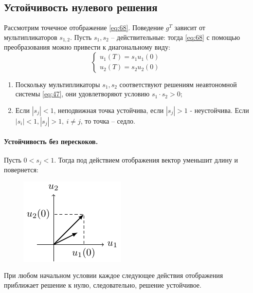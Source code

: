 \subsection{Устойчивость нулевого решения}
Рассмотрим точечное отображение \eqref{eq:68}. Поведение $g^T$ зависит от мультипликаторов $s_{1,2}$. Пусть $s_1, s_2$ -- действительные: тогда \eqref{eq:68} с помощью преобразования можно привести к диагональному виду:
\begin{equation}
	\left\{\begin{aligned}
		u_1(T)=s_1 u_1(0) \\
		u_2(T)=s_2 u_2(0)		
	\end{aligned}\right.
	\label{eq:unn}
\end{equation}
\begin{enumerate} 
	\item Поскольку мультипликаторы $s_1, s_2$ соответствуют решениям неавтономной  системы \eqref{eq:47}, они удовлетворяют условию $s_1\cdot s_2>0$;
	\item Если $|s_j|<1$, неподвижная точка устойчива, если $|s_j|>1$ - неустойчива. Если $|s_i|<1, |s_j|>1,~ i\ne j$, то точка -- седло. 
\end{enumerate} 

\paragraph{Устойчивость без перескоков. } Пусть $0<s_j<1$. Тогда под действием отображения вектор уменьшит длину и повернется:
\begin{figure}[H]
	\centering
	\includegraphics[scale=1.5]{img/parametric_oscillations/sj_1}
\end{figure}
При любом начальном условии каждое следующее действия отображения приближает решение к нулю, следовательно, решение устойчивое.

\newpage
